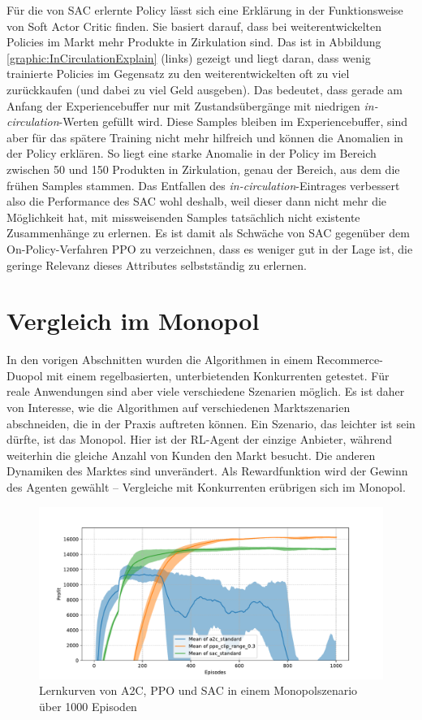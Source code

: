 Für die von SAC erlernte Policy lässt sich eine Erklärung in der Funktionsweise von Soft Actor Critic finden.
Sie basiert darauf, dass bei weiterentwickelten Policies im Markt mehr Produkte in Zirkulation sind.
Das ist in Abbildung \ref{graphic:InCirculationExplain} (links) gezeigt und liegt daran, dass wenig trainierte Policies im Gegensatz zu den weiterentwickelten oft zu viel zurückkaufen (und dabei zu viel Geld ausgeben).
Das bedeutet, dass gerade am Anfang der Experiencebuffer nur mit Zustandsübergänge mit niedrigen \textit{in-circulation}-Werten gefüllt wird.
Diese Samples bleiben im Experiencebuffer, sind aber für das spätere Training nicht mehr hilfreich und können die Anomalien in der Policy erklären.
So liegt eine starke Anomalie in der Policy im Bereich zwischen 50 und 150 Produkten in Zirkulation, genau der Bereich, aus dem die frühen Samples stammen.
Das Entfallen des \textit{in-circulation}-Eintrages verbessert also die Performance des SAC wohl deshalb, weil dieser dann nicht mehr die Möglichkeit hat, mit missweisenden Samples tatsächlich nicht existente Zusammenhänge zu erlernen.
Es ist damit als Schwäche von SAC gegenüber dem On-Policy-Verfahren PPO zu verzeichnen, dass es weniger gut in der Lage ist, die geringe Relevanz dieses Attributes selbstständig zu erlernen.

\section{Vergleich im Monopol}
In den vorigen Abschnitten wurden die Algorithmen in einem Recommerce-Duopol mit einem regelbasierten, unterbietenden Konkurrenten getestet.
Für reale Anwendungen sind aber viele verschiedene Szenarien möglich.
Es ist daher von Interesse, wie die Algorithmen auf verschiedenen Marktszenarien abschneiden, die in der Praxis auftreten können.
Ein Szenario, das leichter ist sein dürfte, ist das Monopol.
Hier ist der RL-Agent der einzige Anbieter, während weiterhin die gleiche Anzahl von Kunden den Markt besucht.
Die anderen Dynamiken des Marktes sind unverändert.
Als Rewardfunktion wird der Gewinn des Agenten gewählt -- Vergleiche mit Konkurrenten erübrigen sich im Monopol.

\begin{figure}[htb]
	\centering
	\includegraphics[width=\textwidth]{main/comparison_monopoly.pdf}
	\caption{Lernkurven von A2C, PPO und SAC in einem Monopolszenario über 1000 Episoden}
	\label{graphic:MonopolyComparison}
\end{figure}

